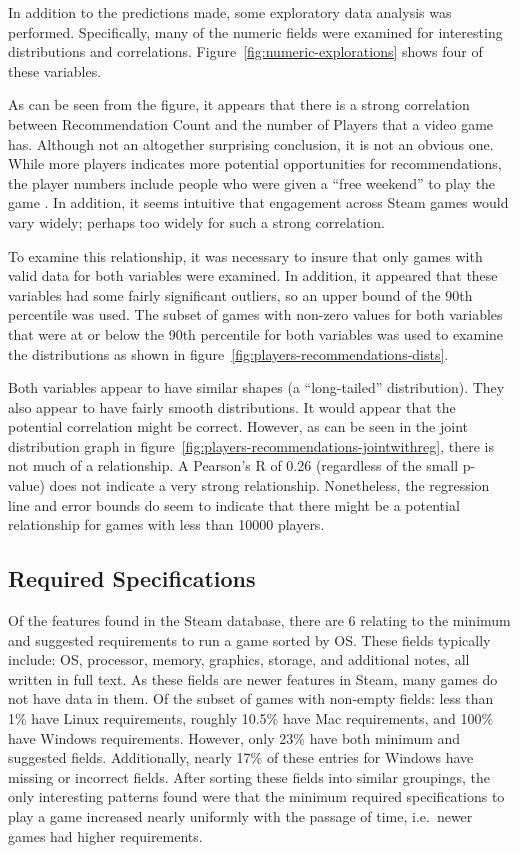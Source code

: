 \documentclass[10pt,journal,compsoc]{IEEEtran}
\begin{document}
In addition to the predictions made, some exploratory data analysis was performed.
Specifically, many of the numeric fields were examined for interesting distributions
and correlations. Figure~\ref{fig:numeric-explorations} shows four of these variables.

As can be seen from the figure, it appears that there is a strong correlation
between Recommendation Count and the number of Players that a video game has.
Although not an altogether surprising conclusion, it is not an obvious one.
While more players indicates more potential opportunities for recommendations,
the player numbers include people who were given a ``free weekend'' to play
the game \cite{steamspy}. In addition, it seems intuitive that engagement
across Steam games would vary widely; perhaps too widely for such a strong
correlation.

To examine this relationship, it was necessary to insure that only games with
valid data for both variables were examined. In addition, it appeared that
these variables had some fairly significant outliers, so an upper bound of the
90th percentile was used. The subset of games with non-zero values for both
variables that were at or below the 90th percentile for both variables was used to
examine the distributions as shown in figure~\ref{fig:players-recommendations-dists}.

Both variables appear to have similar shapes (a ``long-tailed''
distribution). They also appear to have fairly smooth distributions. It would
appear that the potential correlation might be correct. However, as can be
seen in the joint distribution graph in figure~\ref{fig:players-recommendations-jointwithreg},
there is not much of a relationship. A Pearson's R of 0.26
(regardless of the small p-value) does not indicate a very strong
relationship. Nonetheless, the regression line and error bounds do seem to
indicate that there might be a potential relationship for games with less
than 10000 players.

\subsection{Required Specifications}

Of the features found in the Steam database, there are 6 relating to the
minimum and suggested requirements to run a game sorted by OS. These fields
typically include: OS, processor, memory, graphics, storage, and additional
notes, all written in full text. As these fields are newer features in Steam,
many games do not have data in them. Of the subset of games with non-empty
fields: less than 1\% have Linux requirements, roughly 10.5\% have Mac
requirements, and 100\% have Windows requirements. However, only 23\% have both
minimum and suggested fields. Additionally, nearly 17\% of these entries for
Windows have missing or incorrect fields. After sorting these fields into
similar groupings, the only interesting patterns found were that the minimum
required specifications to play a game increased nearly uniformly with the
passage of time, i.e.\ newer games had higher requirements.
\end{document}
